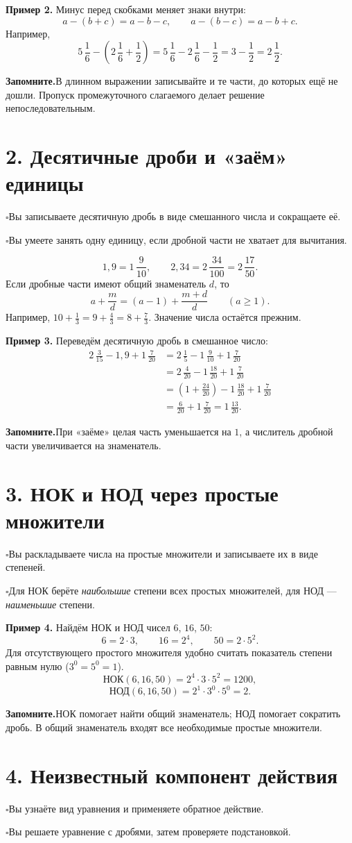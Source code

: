 \documentclass[a4paper,12pt]{article}
\newcommand{\sectionline}[1]{\section*{\color{darkaccent}#1}}
\newcommand{\learn}[1]{\par\noindent$\square$\enspace #1\par}
\newcommand{\keyidea}[1]{\par\noindent\textcolor{darkaccent}{\textbf{Запомните.}}\enspace #1\par}
\newcommand{\mix}[3]{#1\,\frac{#2}{#3}}
\begin{document}
\textbf{Пример 2.} Минус перед скобками меняет знаки внутри:
\[
a-(b+c)=a-b-c,\qquad a-(b-c)=a-b+c.
\]
Например,
\[
\mix{5}{1}{6}-\left(\mix{2}{1}{6}+\frac12\right)
=\mix{5}{1}{6}-\mix{2}{1}{6}-\frac12
=3-\frac12=\boxed{\mix{2}{1}{2}}.
\]
\keyidea{В длинном выражении записывайте и те части, до которых ещё не дошли.
Пропуск промежуточного слагаемого делает решение непоследовательным.}

\sectionline{2. Десятичные дроби и «заём» единицы}
\learn{Вы записываете десятичную дробь в виде смешанного числа и сокращаете её.}
\learn{Вы умеете занять одну единицу, если дробной части не хватает для вычитания.}

\[
1{,}9=\mix{1}{9}{10},
\qquad
2{,}34=\mix{2}{34}{100}=\mix{2}{17}{50}.
\]
Если дробные части имеют общий знаменатель $d$, то
\[
a+\frac{m}{d}=(a-1)+\frac{m+d}{d}
\qquad (a\geq1).
\]
Например, $10+\frac13=9+\frac43=8+\frac73$.
Значение числа остаётся прежним.

\textbf{Пример 3.} Переведём десятичную дробь в смешанное число:
\begin{align*}
\mix{2}{3}{15}-1{,}9+\mix{1}{7}{20}
&=\mix{2}{1}{5}-\mix{1}{9}{10}+\mix{1}{7}{20}\\
&=\mix{2}{4}{20}-\mix{1}{18}{20}+\mix{1}{7}{20}\\
&=\left(1+\frac{24}{20}\right)-\mix{1}{18}{20}+\mix{1}{7}{20}\\
&=\frac6{20}+\mix{1}{7}{20}
=\boxed{\mix{1}{13}{20}}.
\end{align*}
\keyidea{При «заёме» целая часть уменьшается на $1$, а числитель
дробной части увеличивается на знаменатель.}

\sectionline{3. НОК и НОД через простые множители}
\learn{Вы раскладываете числа на простые множители и записываете их в виде степеней.}
\learn{Для НОК берёте \emph{наибольшие} степени всех простых множителей,
для НОД --- \emph{наименьшие} степени.}

\textbf{Пример 4.} Найдём НОК и НОД чисел $6$, $16$, $50$:
\[
6=2\cdot3,\qquad 16=2^4,\qquad 50=2\cdot5^2.
\]
Для отсутствующего простого множителя удобно считать показатель степени
равным нулю ($3^0=5^0=1$).
\[
\text{НОК}(6,16,50)=2^4\cdot3\cdot5^2=\boxed{1200},
\]
\[
\text{НОД}(6,16,50)=2^1\cdot3^0\cdot5^0=\boxed{2}.
\]
\keyidea{НОК помогает найти общий знаменатель; НОД помогает сократить дробь.
В общий знаменатель входят все необходимые простые множители.}

\sectionline{4. Неизвестный компонент действия}
\learn{Вы узнаёте вид уравнения и применяете обратное действие.}
\learn{Вы решаете уравнение с дробями, затем проверяете подстановкой.}
\end{document}
